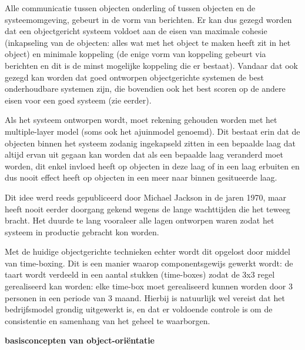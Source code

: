 Alle communicatie tussen objecten onderling of tussen objecten en de systeemomgeving, gebeurt in de vorm van berichten. Er kan dus gezegd worden dat een objectgericht systeem voldoet aan de eisen van maximale cohesie (inkapseling van de objecten: alles wat met het object te maken heeft zit in het object) en minimale koppeling (de enige vorm van koppeling gebeurt via berichten en dit is de minst mogelijke koppeling die er bestaat). Vandaar dat ook gezegd kan worden dat goed ontworpen objectgerichte systemen de best onderhoudbare systemen zijn, die bovendien ook het best scoren op de andere eisen voor een goed systeem (zie eerder).

Als het systeem ontworpen wordt, moet rekening gehouden worden met het multiple-layer model (soms ook het ajuinmodel genoemd). Dit bestaat erin dat de objecten binnen het systeem zodanig ingekapseld zitten in een bepaalde laag dat altijd ervan uit gegaan kan worden dat als een bepaalde laag veranderd moet worden, dit enkel invloed heeft op objecten in deze laag of in een laag erbuiten en dus nooit effect heeft op objecten in een meer naar binnen gesitueerde laag.

Dit idee werd reeds gepubliceerd door Michael Jackson in de jaren 1970, maar heeft nooit eerder doorgang gekend wegens de lange wachttijden die het teweeg bracht. Het duurde te lang vooraleer alle lagen ontworpen waren zodat het systeem in productie gebracht kon worden.

Met de huidige objectgerichte technieken echter wordt dit opgelost door middel van time-boxing. Dit is een manier waarop componentsgewijs gewerkt wordt: de taart wordt verdeeld in een aantal stukken (time-boxes) zodat de 3x3 regel gerealiseerd kan worden: elke time-box moet gerealiseerd kunnen worden door 3 personen in een periode van 3 maand. Hierbij is natuurlijk wel vereist dat het bedrijfsmodel grondig uitgewerkt is, en dat er voldoende controle is om de consistentie en samenhang van het geheel te waarborgen.
\newpage

\textbf{basisconcepten van object-oriëntatie}

